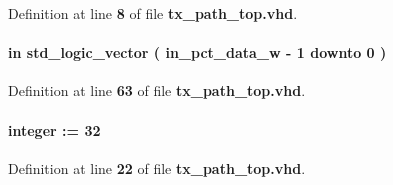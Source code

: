 Definition at line {\bf 8} of file {\bf tx\+\_\+path\+\_\+top.\+vhd}.

\paragraph[{in\+\_\+pct\+\_\+data}]{ {\bfseries \textcolor{keywordflow}{in}\textcolor{vhdlchar}{ }} {\bfseries \textcolor{comment}{std\+\_\+logic\+\_\+vector}\textcolor{vhdlchar}{ }\textcolor{vhdlchar}{(}\textcolor{vhdlchar}{ }\textcolor{vhdlchar}{ }\textcolor{vhdlchar}{ }\textcolor{vhdlchar}{ }{\bfseries {\bf in\+\_\+pct\+\_\+data\+\_\+w}} \textcolor{vhdlchar}{-\/}\textcolor{vhdlchar}{ } \textcolor{vhdldigit}{1} \textcolor{vhdlchar}{ }\textcolor{keywordflow}{downto}\textcolor{vhdlchar}{ }\textcolor{vhdlchar}{ } \textcolor{vhdldigit}{0} \textcolor{vhdlchar}{ }\textcolor{vhdlchar}{)}\textcolor{vhdlchar}{ }} \hspace{0.3cm}{\ttfamily [Port]}}\label{classtx__path__top_aedf5f7fe5cea9eafd5e8a7b477065c1c}


Definition at line {\bf 63} of file {\bf tx\+\_\+path\+\_\+top.\+vhd}.

\paragraph[{in\+\_\+pct\+\_\+data\+\_\+w}]{ {\bfseries \textcolor{vhdlchar}{ }} {\bfseries \textcolor{comment}{integer}\textcolor{vhdlchar}{ }\textcolor{vhdlchar}{ }\textcolor{vhdlchar}{\+:}\textcolor{vhdlchar}{=}\textcolor{vhdlchar}{ }\textcolor{vhdlchar}{ } \textcolor{vhdldigit}{32} \textcolor{vhdlchar}{ }} \hspace{0.3cm}{\ttfamily [Generic]}}\label{classtx__path__top_a95676500d5b1dd663594499d9fcca396}


Definition at line {\bf 22} of file {\bf tx\+\_\+path\+\_\+top.\+vhd}.

